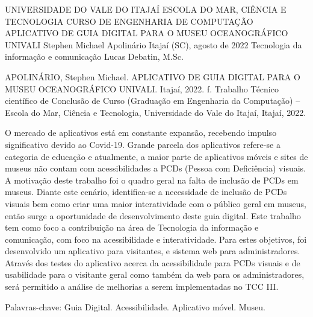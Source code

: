 
\begin{Info}
    {UNIVERSIDADE DO VALE DO ITAJAÍ}
    {ESCOLA DO MAR, CIÊNCIA E TECNOLOGIA}
    {CURSO DE ENGENHARIA DE COMPUTAÇÃO}
    {APLICATIVO DE GUIA DIGITAL PARA O MUSEU OCEANOGRÁFICO UNIVALI}
    {Stephen Michael Apolinário}
    {Itajaí (SC), agosto de 2022}
    {Tecnologia da informação e comunicação}
    {Lucas Debatin, M.Sc.}
    {}
    \end{Info}
    
    
    
    
    \begin{Resumo}
    
    APOLINÁRIO, Stephen Michael. APLICATIVO DE GUIA DIGITAL PARA O MUSEU
    OCEANOGRÁFICO UNIVALI. Itajaí, 2022. \pageref{LastPage} f. Trabalho Técnico científico de Conclusão de Curso (Graduação em Engenharia da Computação) -- Escola do Mar, Ciência e Tecnologia, Universidade do Vale do Itajaí, Itajaí, 2022.
       
    O mercado de aplicativos está em constante expansão, recebendo impulso significativo devido ao Covid-19. Grande parcela dos aplicativos refere-se a categoria de educação e atualmente, a maior parte de aplicativos móveis e sites de museus não contam com acessibilidades a PCDs (Pessoa com Deficiência) visuais. A motivação deste trabalho foi o quadro geral na falta de inclusão de PCDs em museus. Diante este cenário, identifica-se a necessidade de inclusão de PCDs visuais bem como criar uma maior interatividade com o público geral em museus, então surge a oportunidade de desenvolvimento deste guia digital. Este trabalho tem como foco a contribuição na área de Tecnologia da informação e comunicação, com foco na acessibilidade e interatividade. Para estes objetivos, foi desenvolvido um aplicativo para visitantes, e sistema web para administradores. Através dos testes do aplicativo acerca da acessibilidade para PCDs visuais e de usabilidade para o visitante geral como também da web para os administradores, será permitido a análise de melhorias a serem implementadas no TCC III.

    Palavras-chave: Guia Digital. Acessibilidade. Aplicativo móvel. Museu. 
    
    \end{Resumo}
    
